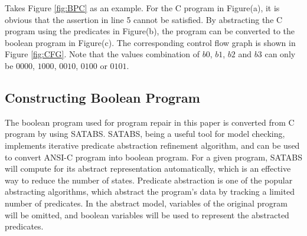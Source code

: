Takes Figure \ref{fig:BPC} as an example. For the C program in Figure(a), it is obvious that the assertion in line 5 cannot be satisfied.
By abstracting the C program using the predicates in Figure(b), the program can be converted to the boolean program in Figure(c).
The corresponding control flow graph is shown in Figure \ref{fig:CFG}. Note that the values combination of $b0$, $b1$, $b2$ and $b3$ can only be $0000$, $1000$, $0010$, $0100$ or $0101$.

\subsection{Constructing Boolean Program}
\label{section:ConstructingBooleanProgram}
The boolean program used for program repair in this paper is converted from C program by using SATABS\cite{SATABS}.
SATABS, being a useful tool for model checking, implements iterative predicate abstraction refinement algorithm\cite{CCoCaVUPAaI}, and can be used to convert ANSI-C program into boolean program.
For a given program, SATABS will compute for its abstract representation automatically, which is an effective way to reduce the number of states.
Predicate abstraction\cite{CoASGwPVS,GFSAoRSUDP} is one of the popular abstracting algorithms, which abstract the program's data by tracking a limited number of predicates.
In the abstract model, variables of the original program will be omitted, and boolean variables will be used to represent the abstracted predicates.
